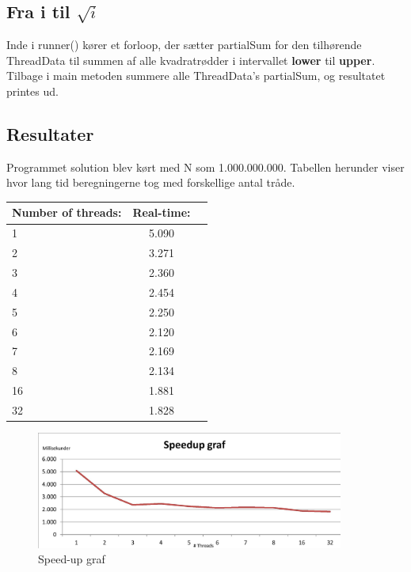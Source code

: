 \subsection{Fra i til $\sqrt{i}$}
Inde i runner() kører et forloop, der sætter partialSum for den tilhørende ThreadData til summen af alle kvadratrødder i intervallet \textbf{lower} til \textbf{upper}. Tilbage i main metoden summere alle ThreadData's partialSum, og resultatet printes ud.

\subsection{Resultater}
Programmet solution blev kørt med N som 1.000.000.000. Tabellen herunder viser hvor lang tid beregningerne tog med forskellige antal tråde.

\begin{center}
  \begin{tabular}{ | l | c | r | }
    \hline
    \textbf{Number of threads:} & \textbf{Real-time:} \\ \hline
    1 & 5.090 \\ \hline
	2 & 3.271 \\ \hline
	3 & 2.360 \\ \hline
	4 & 2.454 \\ \hline
	5 & 2.250 \\ \hline
	6 & 2.120 \\ \hline
	7 & 2.169 \\ \hline
	8 & 2.134 \\ \hline
	16 & 1.881 \\ \hline
	32 & 1.828 \\ \hline
  \end{tabular}
\end{center}

\begin{figure}[h!]
  \caption{Speed-up graf}
  \centering
    \includegraphics[width=0.9\textwidth]{Speedup-graf}
\end{figure}
